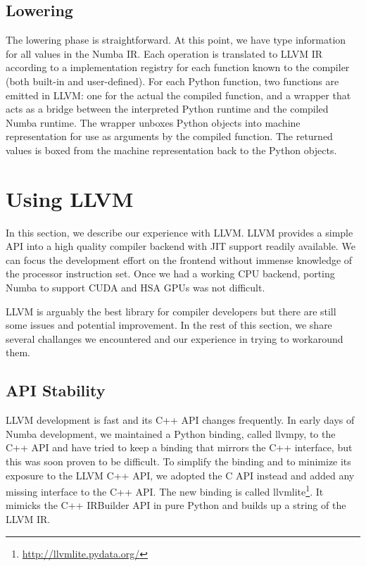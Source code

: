 \documentclass{acm_proc_article-sp}
\begin{document}
\subsection{Lowering}

The lowering phase is straightforward.  At this point, we have type
information for all values in the Numba IR. Each operation is
translated to LLVM IR according to a implementation registry for each
function known to the compiler (both built-in and user-defined).  For
each Python function, two functions are emitted in LLVM: one for the
actual the compiled function, and a wrapper that acts as a bridge
between the interpreted Python runtime and the compiled Numba
runtime. The wrapper unboxes Python objects into machine
representation for use as arguments by the compiled function.  The
returned values is boxed from the machine representation back to the
Python objects.


\section{Using LLVM}

In this section, we describe our experience with LLVM.
LLVM provides a simple API into a high quality compiler backend with
JIT support readily available. We can focus the development effort
on the frontend without immense knowledge of the processor instruction set.
Once we had a working CPU backend, porting Numba to support CUDA and HSA GPUs
was not difficult.

LLVM is arguably the best library for compiler developers but there are still
some issues and potential improvement. In the rest of
this section, we share several challanges we encountered and our experience
in trying to workaround them.

\subsection{API Stability}

LLVM development is fast and its C++ API changes frequently.
In early days of Numba development, we maintained a Python binding,
called llvmpy, to the C++ API and have tried to keep a binding that
mirrors the C++ interface, but this was soon proven to be difficult.
To simplify the binding and to minimize its exposure to the LLVM C++ API,
we adopted the C API instead and added any missing interface to the C++ API.
The new binding is called llvmlite\footnote{\url{http://llvmlite.pydata.org/}}.
It mimicks the C++ IRBuilder API in pure Python and builds up a string of the LLVM IR.
\end{document}
